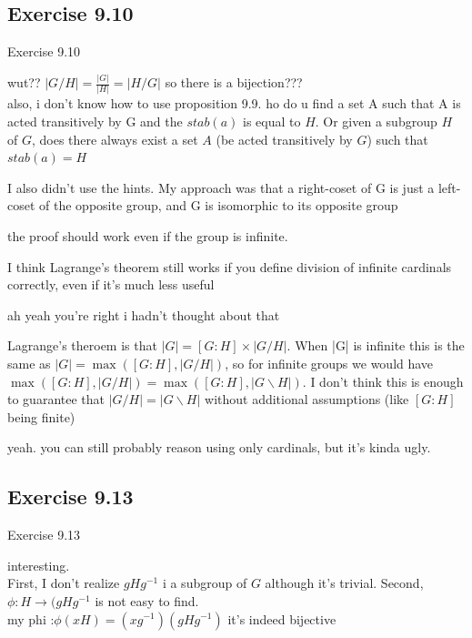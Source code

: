 \documentclass[15pt]{scrartcl}
\begin{document}
\subsection{Exercise 9.10}
\begin{discussion*}Exercise 9.10
    \begin{abboy*}
        wut?? $|G/H|=\frac{|G|}{|H|}=|H/G|$ so there is a bijection??? 
        \\
        also, i don't know how to use proposition 9.9. ho do u find a set A such that A is acted transitively by G and the $stab(a)$ is equal to $H$.  Or given a subgroup $H$ of $G$, does there always exist a set $A$ (be acted transitively by $G$) such that $stab(a)=H$
    \end{abboy*}
    \begin{evie*}
        I also didn't use the hints. My approach was that a right-coset of G is just a left-coset of the opposite group, and G is isomorphic to its opposite group
    \end{evie*}
    \begin{arthur*}
        the proof should work even if the group is infinite.
    \end{arthur*}
    \begin{evie*}
        I think Lagrange's theorem still works if you define division of infinite cardinals correctly, even if it's much less useful
    \end{evie*}
    \begin{arthur*}
        ah yeah you're right i hadn't thought about that
    \end{arthur*}
    \begin{evie*}
        Lagrange's theroem is that $|G| = [G:H] \times  |G/H|$. When |G| is infinite this is the same as $|G| = \max([G : H], |G/H|)$, so for infinite groups we would have $\max([G : H], |G/H|) = \max([G : H], |G \backslash H|)$. I don't think this is enough to guarantee that $|G/H|=|G\backslash H|$ without additional assumptions (like $[G : H]$ being finite)
    \end{evie*}
    \begin{arthur*}
        yeah. you can still probably reason using only cardinals, but it's kinda ugly.
    \end{arthur*}
\end{discussion*}


\subsection{Exercise 9.13}
\begin{discussion*}Exercise 9.13
    \begin{abboy*}
        interesting. 
        \\
        First, I don't realize $gHg^{-1}$ i a subgroup of $G$ although it's trivial. 
        Second, $\phi: H \to (gHg^{-1}$ is not easy to find.
        \\
        my phi :$\phi(xH)=(xg^{-1}) (gHg^{-1})$
        it's indeed bijective
    \end{abboy*}
\end{discussion*}
\end{document}
